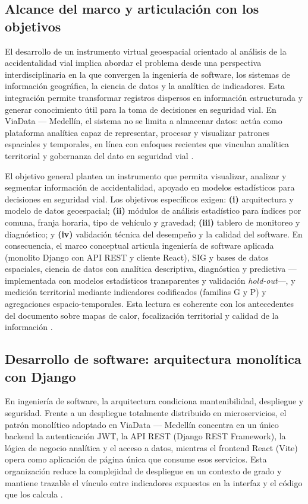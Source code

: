 \subsection{Alcance del marco y articulación con los objetivos}
El desarrollo de un instrumento virtual geoespacial orientado al análisis de la accidentalidad vial implica abordar el problema desde una perspectiva interdisciplinaria en la que convergen la ingeniería de software, los sistemas de información geográfica, la ciencia de datos y la analítica de indicadores. Esta integración permite transformar registros dispersos en información estructurada y generar conocimiento útil para la toma de decisiones en seguridad vial. En ViaData — Medellín, el sistema no se limita a almacenar datos: actúa como plataforma analítica capaz de representar, procesar y visualizar patrones espaciales y temporales, en línea con enfoques recientes que vinculan analítica territorial y gobernanza del dato en seguridad vial \cite{oms2024,monar2025}.

El objetivo general plantea un instrumento que permita visualizar, analizar y segmentar información de accidentalidad, apoyado en modelos estadísticos para decisiones en seguridad vial. Los objetivos específicos exigen: \textbf{(i)} arquitectura y modelo de datos geoespacial; \textbf{(ii)} módulos de análisis estadístico para índices por comuna, franja horaria, tipo de vehículo y gravedad; \textbf{(iii)} tablero de monitoreo y diagnóstico; y \textbf{(iv)} validación técnica del desempeño y la calidad del software. En consecuencia, el marco conceptual articula ingeniería de software aplicada (monolito Django con API REST y cliente React), SIG y bases de datos espaciales, ciencia de datos con analítica descriptiva, diagnóstica y predictiva ---implementada con modelos estadísticos transparentes y validación \textit{hold-out}---, y medición territorial mediante indicadores codificados (familias G y P) y agregaciones espacio-temporales. Esta lectura es coherente con los antecedentes del documento sobre mapas de calor, focalización territorial y calidad de la información \cite{parraga2024,oviedo2025}.

\subsection{Desarrollo de software: arquitectura monolítica con Django}
En ingeniería de software, la arquitectura condiciona mantenibilidad, despliegue y seguridad. Frente a un despliegue totalmente distribuido en microservicios, el patrón monolítico adoptado en ViaData — Medellín concentra en un único backend la autenticación JWT, la API REST (Django REST Framework), la lógica de negocio analítica y el acceso a datos, mientras el frontend React (Vite) opera como aplicación de página única que consume esos servicios. Esta organización reduce la complejidad de despliegue en un contexto de grado y mantiene trazable el vínculo entre indicadores expuestos en la interfaz y el código que los calcula \cite{lugo2025}.

